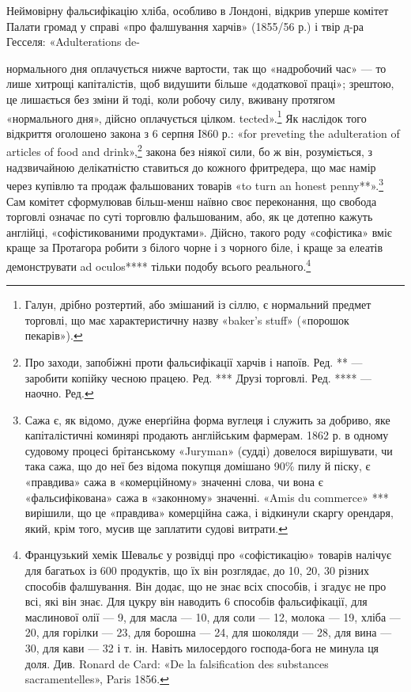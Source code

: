 Неймовірну фальсифікацію хліба, особливо в Лондоні, відкрив
уперше комітет Палати громад у справі «про фалшування
харчів» (1855/56 р.) і твір д-ра Гесселя: «Adulterations de-

нормального дня оплачується нижче вартости, так що «надробочий
час» — то лише хитрощі капіталістів, щоб видушити більше «додаткової
праці»; зрештою, це лишається без зміни й тоді, коли робочу силу, вживану
протягом «нормального дня», дійсно оплачується цілком.
tected».\footnote{
Галун, дрібно розтертий, або змішаний із сіллю, є нормальний
предмет торговлі, що має характеристичну назву «baker’s stuff» («порошок
пекарів»).
} Як наслідок того відкриття оголошено закона з 6 серпня
I860 р.: «for preveting the adulteration of articles of food
and drink»,\footnote*{
Про заходи, запобіжні проти фальсифікації харчів і напоїв. Ред.
** — заробити копійку чесною працею. Ред.
*** Друзі торговлі. Ред.
**** — наочно. Ред.
} закона без ніякої сили, бо ж він, розуміється, з
надзвичайною делікатністю ставиться до кожного фритредера,
що має намір через купівлю та продаж фальшованих товарів «to
turn an honest penny**».\footnote{
Сажа є, як відомо, дуже енерґійна форма вуглеця і служить за
добриво, яке капіталістичні коминярі продають англійським фармерам.
1862 р. в одному судовому процесі брітанському «Juryman» (судді) довелося
вирішувати, чи така сажа, що до неї без відома покупця домішано
90\% пилу й піску, є «правдива» сажа в «комерційному» значенні слова,
чи вона є «фальсифікована» сажа в «законному» значенні. «Amis du
commerce» *** вирішили, що це «правдива» комерційна сажа, і відкинули
скаргу орендаря, який, крім того, мусив ще заплатити судові витрати.
} Сам комітет сформулював більш-менш
наївно своє переконання, що свобода торговлі означає по суті
торговлю фальшованим, або, як це дотепно кажуть англійці, «софістикованими
продуктами». Дійсно, такого роду «софістика»
вміє краще за Протагора робити з білого чорне і з чорного біле,
і краще за елеатів демонструвати ad oculos**** тільки подобу всього
реального.\footnote{
Французький хемік Шевальє у розвідці про «софістикацію» товарів
налічує для багатьох із 600 продуктів, що їх він розглядає, до 10, 20,
30 різних способів фалшування. Він додає, що не знає всіх способів, і
згадує не про всі, які він знає. Для цукру він наводить 6 способів фальсифікації,
для маслинової олії — 9, для масла — 10, для соли — 12, молока
— 19, хліба — 20, для горілки — 23, для борошна — 24, для шоколяди
— 28, для вина — 30, для кави — 32 і т. ін. Навіть милосердого господа-бога
не минула ця доля. Див. Ronard de Card: «De la falsification
des substances sacramentelles», Paris 1856.
}

